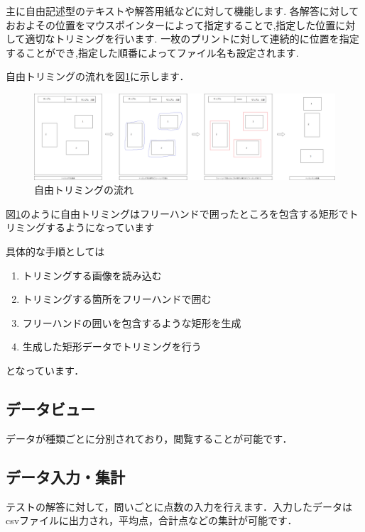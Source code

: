 \documentclass[12pt]{jsreport}
\begin{document}
    主に自由記述型のテキストや解答用紙などに対して機能します.
    各解答に対しておおよその位置をマウスポインターによって指定することで,指定した位置に対して適切なトリミングを行います.
    一枚のプリントに対して連続的に位置を指定することができ,指定した順番によってファイル名も設定されます.

    自由トリミングの流れを図\ref{fig:FreeTrimFlow}に示します．

    \begin{figure}[htbp]
        \centering
        \begin{minipage}{1\hsize}
            \begin{center}
                \includegraphics[width=150mm]{FreeTrimFlow.png}
            \end{center}
            \caption{自由トリミングの流れ}
            \label{fig:FreeTrimFlow}
        \end{minipage}
    \end{figure}

    図\ref{fig:FreeTrimFlow}のように自由トリミングはフリーハンドで囲ったところを包含する矩形でトリミングするようになっています


    具体的な手順としては
    \begin{enumerate}
        \item トリミングする画像を読み込む
        \item トリミングする箇所をフリーハンドで囲む
        \item フリーハンドの囲いを包含するような矩形を生成
        \item 生成した矩形データでトリミングを行う
    \end{enumerate}

    となっています．

\subsection{データビュー}
データが種類ごとに分別されており，閲覧することが可能です．
\subsection{データ入力・集計}
テストの解答に対して，問いごとに点数の入力を行えます．入力したデータはcsvファイルに出力され，平均点，合計点などの集計が可能です．
\end{document}
